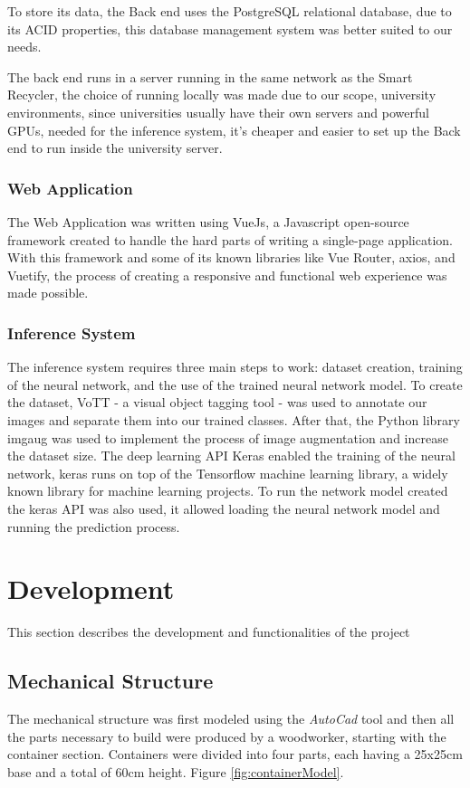 \documentclass[a4paper,11pt]{article}
\begin{document}
To store its data, the Back end uses the PostgreSQL\cite{postgre} relational database, due to its ACID properties, this database management system was better suited to our needs.

The back end runs in a server running in the same network as the Smart Recycler, the choice of running locally was made due to our scope, university environments, since universities usually have their own servers and powerful GPUs, needed for the inference system, it’s cheaper and easier to set up the Back end to run inside the university server.


\subsubsection{Web Application}
The Web Application was written using VueJs\cite{vuejs}, a Javascript open-source framework created to handle the hard parts of writing a single-page application. With this framework and some of its known libraries like Vue Router, axios, and Vue\-tify, the process of creating a responsive and functional web experience was made possible.

\subsubsection{Inference System}
The inference system requires three main steps to work: dataset creation, training of the neural network, and the use of the trained neural network model. To create the dataset, VoTT\cite{vott} - a visual object tagging tool - was used to annotate our images and separate them into our trained classes. After that, the Python library imgaug was used to implement the process of image augmentation and increase the dataset size. The deep learning API Keras\cite{keras} enabled the training of the neural network, keras runs on top of the Tensorflow\cite{tensorflow} machine learning library, a widely known library for machine learning projects. To run the network model created the keras API was also used, it allowed loading the neural network model and running the prediction process.

\section{Development}
\label{sec:dev}
This section describes the development and functionalities of the project

\subsection{Mechanical Structure}
\label{subsec:Mechanical}
The mechanical structure was first modeled using the \textit{AutoCad} \cite{AutoCad} tool and then all the parts necessary to build were produced by a woodworker, starting with the container section. Containers were divided into four parts, each having a 25x25cm base and a total of 60cm height. Figure \ref{fig:containerModel}.
\end{document}
